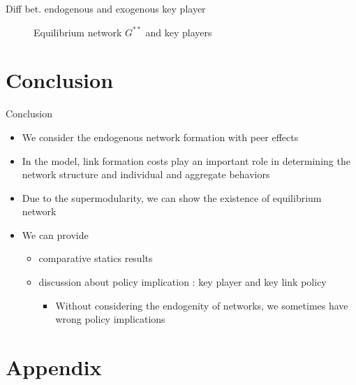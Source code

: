 \documentclass[10pt,dvipdfmx]{beamer}
\begin{document}
\begin{frame}{Diff bet. endogenous and exogenous key player}
\begin{figure}[h]
{}
\caption{Equilibrium network $G^{**}$ and key players}
\end{figure}
\end{frame}


\section{Conclusion}

\begin{frame}{Conclusion}
\begin{itemize}
    \item We consider the endogenous network formation with peer effects
    \item In the model, link formation costs play an important role in determining the network structure and individual and aggregate behaviors
    \item Due to the supermodularity, we can show the existence of equilibrium network
    \item We can provide
    \begin{itemize}
        \item comparative statics results
        \item discussion about policy implication : key player and key link policy
        \begin{itemize}
            \item Without considering the endogenity of networks, we sometimes have wrong policy implications
        \end{itemize}
    \end{itemize}
\end{itemize}
\end{frame}


\section{Appendix}
\end{document}
